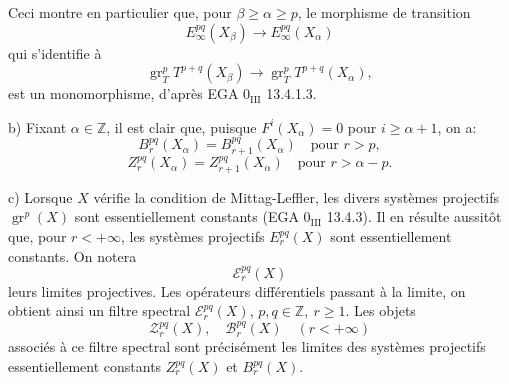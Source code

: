 \documentclass[11pt]{article}
\providecommand{\gr}{\operatorname{gr}}
\providecommand{\gr}{\operatorname{gr}}
\providecommand{\gr}{\operatorname{gr}}
\begin{document}
Ceci montre en particulier que, pour \(\beta\ge\alpha\ge p\), le morphisme de transition
\[
E_\infty^{pq}(X_\beta)\longrightarrow E_\infty^{pq}(X_\alpha)
\]
qui s'identifie à
\[
\gr_T^pT^{p+q}(X_\beta)\longrightarrow
\gr_T^pT^{p+q}(X_\alpha),
\]
est un monomorphisme, d'après EGA \(0_{\mathrm{III}}\) 13.4.1.3.

b) Fixant \(\alpha\in\mathbb Z\), il est clair que, puisque \(F^i(X_\alpha)=0\) pour \(i\ge\alpha+1\), on a:
\[
B_r^{pq}(X_\alpha)=B_{r+1}^{pq}(X_\alpha)\quad\text{pour }r>p,
\]
\[
Z_r^{pq}(X_\alpha)=Z_{r+1}^{pq}(X_\alpha)\quad\text{pour }r>\alpha-p.
\]

c) Lorsque \(X\) vérifie la condition de Mittag-Leffler, les divers systèmes projectifs \(\gr^p(X)\) sont essentiellement constants (EGA \(0_{\mathrm{III}}\) 13.4.3). Il en résulte aussitôt que, pour \(r<+\infty\), les systèmes projectifs \(E_r^{pq}(X)\) sont essentiellement constants. On notera
\[
\mathcal E_r^{pq}(X)
\]
leurs limites projectives. Les opérateurs différentiels passant à la limite, on obtient ainsi un filtre spectral \(\mathcal E_r^{pq}(X)\), \(p,q\in\mathbb Z,\ r\ge1\). Les objets
\[
\mathcal Z_r^{pq}(X),\quad \mathcal B_r^{pq}(X)\quad(r<+\infty)
\]
associés à ce filtre spectral sont précisément les limites des systèmes projectifs essentiellement constants \(Z_r^{pq}(X)\) et \(B_r^{pq}(X)\).
\end{document}
